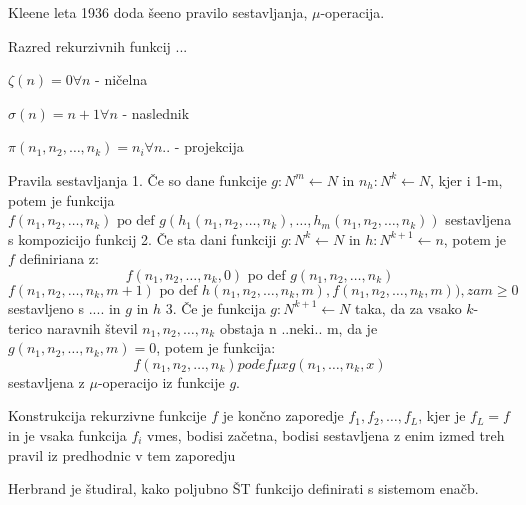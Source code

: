 \documentclass[10pt,a4paper,oneside]{book}
\begin{document}
Kleene leta 1936 doda šeeno pravilo sestavljanja, $\mu$-operacija. %

Razred rekurzivnih funkcij
...
\begin{items}
\item $\zeta(n)=0 \forall n$ - ničelna
\item $\sigma(n)=n+1 \forall n$ - naslednik
\item $\pi(n_1, n_2, \dots, n_k)=n_i \forall n..$ - projekcija
\end{items}
Pravila sestavljanja
1. Če so dane funkcije $g:N^m \leftarrow N$ in $n_h:N^k \leftarrow N$, kjer i 1-m, potem je funkcija $f(n_1,n_2,\dots,n_k) \mbox{ po def } g(h_{1}(n_1,n_2,\dots,n_k),\dots,h_m(n_1,n_2,\dots,n_k))$ sestavljena s kompozicijo funkcij
2. Če sta dani funkciji $g:N^k \leftarrow N$ in $h:N^{k+1}  \leftarrow n$, potem je $f$ definiriana z:
	\[f(n_1, n_2, \dots, n_k, 0) \mbox{ po def } g(n_1, n_2, \dots, n_k)\]
	\[f(n_1, n_2, \dots, n_k, m+1) \mbox{ po def } h(n_1, n_2, \dots, n_k, m), f(n_1, n_2, \dots, n_k, m)), za m \geq 0\]
sestavljeno s .... in $g$ in $h$
3. Če je funkcija $g:N^{k+1} \leftarrow N$ taka, da za vsako $k$-terico naravnih števil $n_1, n_2, \dots, n_k$ obstaja n ..neki.. m, da je $g(n_1, n_2, \dots, n_k, m) = 0$, potem je funkcija:
\[ f(n_1, n_2, \dots, n_k) po def \mu x g(n_1, \dots, n_k, x)\]
sestavljena z $\mu$-operacijo iz funkcije $g$.

Konstrukcija rekurzivne funkcije $f$ je končno zaporedje $f_1,f_2,\dots,f_L$, kjer je $f_L=f$ in je vsaka funkcija $f_i$ vmes, bodisi začetna, bodisi sestavljena z enim izmed treh pravil iz predhodnic v tem zaporedju %


Herbrand je študiral, kako poljubno ŠT funkcijo definirati s sistemom enačb.
\end{document}

